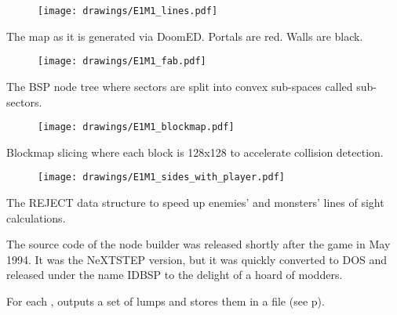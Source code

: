 %
\begin{figure}[H]
\vspace*{3mm}
\centering
\texttt{[image: drawings/E1M1\_lines.pdf]}
\end{figure}
\par
The map as it is generated via DoomED. Portals are red. Walls are black.\\
\par
\begin{figure}[H]
\vspace*{2mm}
\centering
\texttt{[image: drawings/E1M1\_fab.pdf]}
\end{figure}
The BSP node tree where sectors are split into convex sub-spaces called sub-sectors.



\begin{figure}[H]
\centering
\texttt{[image: drawings/E1M1\_blockmap.pdf]}
\end{figure}
\par
Blockmap slicing where each block is 128x128 to accelerate collision detection.\\
\par
\begin{figure}[H]
\centering
\texttt{[image: drawings/E1M1\_sides\_with\_player.pdf]}
\end{figure}
\par
The REJECT data structure to speed up enemies' and monsters' lines of sight calculations.
\pagebreak


The source code of the node builder was released shortly after the game in May 1994. It was the NeXTSTEP version, but it was quickly converted to DOS and released under the name IDBSP to the delight of a hoard of modders.\\
\par
{}
\par
For each ,  outputs a set of lumps and stores them in a  file (see p\pageref{wad_explained}).\\

